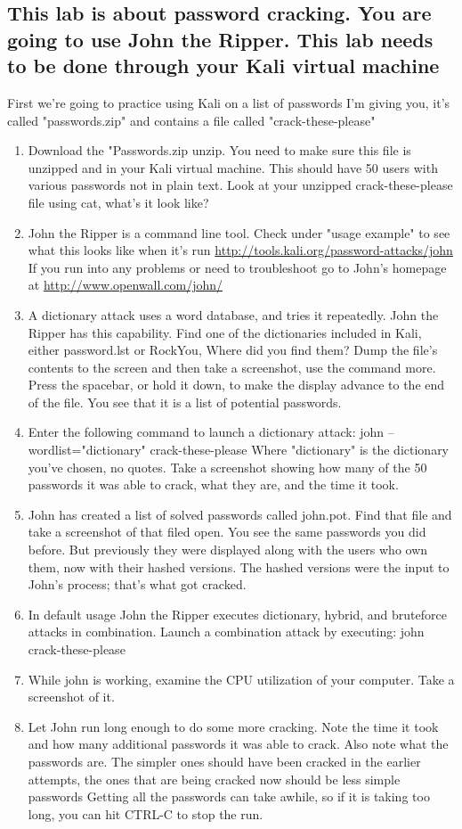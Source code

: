 \documentclass[12pt]{article}
\begin{document}
\subsection*{This lab is about password cracking. You are going to use John the Ripper. This lab needs to be done through your Kali virtual machine}
First we're going to practice using Kali on a list of passwords I'm giving you, it's called "passwords.zip" and contains a file called "crack-these-please"
    \begin{enumerate}
        \item Download the "Passwords.zip  unzip. You need to make sure this file is unzipped and in your Kali virtual machine.  This should have 50 users with various passwords not in plain text.  Look at your unzipped crack-these-please file using cat, what's it look like?
        \item John the Ripper is a command line tool.  Check under "usage example" to see what this looks like when it's run \url{http://tools.kali.org/password-attacks/john} If you run into any problems or need to troubleshoot go to John's homepage at \url{http://www.openwall.com/john/}
        \item A dictionary attack uses a word database, and tries it repeatedly. John the Ripper has this capability. Find one of the dictionaries included in Kali, either password.lst or RockYou,  Where did you find them? Dump the file's contents to the screen and then take a screenshot, use the command more.
        Press the spacebar, or hold it down, to make the display advance to the end of the file. You see that it is a list of potential passwords.
        \item Enter the following command to launch a dictionary attack:
        john --wordlist="dictionary" crack-these-please
        Where "dictionary" is the dictionary you've chosen, no quotes.
        Take a screenshot showing how many of the 50 passwords it was able to crack, what they are, and the time it took.
        \item John has created a list of solved passwords called john.pot.  Find that file and take a screenshot of that filed open.
        You see the same passwords you did before. But previously they were displayed along with the users who own them, now with their hashed versions. The hashed versions were the input to John's process; that's what got cracked.
        \item In default usage John the Ripper executes dictionary, hybrid, and bruteforce attacks in combination. Launch a combination attack by executing:
        john crack-these-please
        \item While john is working, examine the CPU utilization of your computer. Take a screenshot of it.
        \item Let John run long enough to do some more cracking. Note the time it took and how many additional passwords it was able to crack. Also note what the passwords are. The simpler ones should have been cracked in the earlier attempts, the ones that are being cracked now should be less simple passwords
        Getting all the passwords can take awhile, so if it is taking too long, you can hit CTRL-C to stop the run.
    \end{enumerate}
\end{document}
